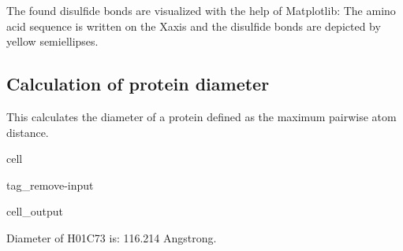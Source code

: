 \documentclass[letterpaper,10pt,english]{jupyterBook}
\begin{document}
\sphinxAtStartPar
The found disulfide bonds are visualized with the help of Matplotlib: The amino acid sequence is written on the X\sphinxhyphen{}axis and the disulfide bonds are depicted by yellow semi\sphinxhyphen{}ellipses.


\subsection{Calculation of protein diameter}
\label{\detokenize{ipynb/chapter1:calculation-of-protein-diameter}}
\sphinxAtStartPar
This calculates the diameter of a protein defined as the maximum pairwise atom distance.

\begin{sphinxuseclass}{cell}
\begin{sphinxuseclass}{tag_remove-input}\begin{sphinxVerbatimOutput}

\begin{sphinxuseclass}{cell_output}
\begin{sphinxVerbatim}[commandchars=\\\{\}]
\PYGZsh{} Diameter of H\PYGZus{}01C73 is: \PYGZhy{}\PYGZhy{}\PYGZhy{}\PYGZhy{}\PYGZhy{}\PYGZhy{}\PYGZhy{}\PYGZhy{}\PYGZhy{}\PYGZhy{}\PYGZhy{}\PYGZhy{}\PYGZhy{}\PYGZhy{}\PYGZhy{}\PYGZhy{}\PYGZhy{}\PYGZhy{}\PYGZhy{}\PYGZhy{}\PYGZhy{}\PYGZhy{}\PYGZhy{}116.214 Angstrong.
\end{sphinxVerbatim}

\end{sphinxuseclass}\end{sphinxVerbatimOutput}

\end{sphinxuseclass}
\end{sphinxuseclass}
\end{document}
